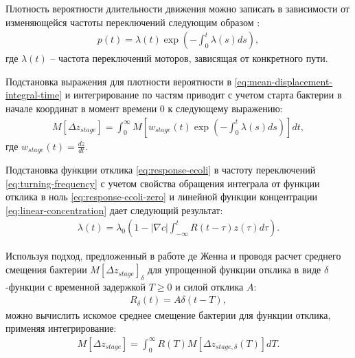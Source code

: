 Плотность вероятности длительности движения можно записать в зависимости от изменяющейся частоты переключений следующим образом \cite{pasupathy_generating_2011}:
\begin{equation}
    \begin{aligned}
        p(t)=\lambda(t) \exp \left ( -\int_0^t \lambda(s) ds \right ),
    \label{eq:duration-prob-exp-integral}
    \end{aligned}
\end{equation}
где $\lambda(t)$ -- частота переключений моторов, зависящая от конкретного пути.

Подстановка выражения для плотности вероятности в \cref{eq:mean-displacement-integral-time} и интегрирование по частям приводит с учетом старта бактерии в начале координат в момент времени 0 к следующему выражению:
\begin{equation}
    \begin{aligned}
        M\left [\Delta z_{stage} \right ]=\int_0^{\infty} M\left [w_{stage}(t) \exp \left ( -\int_0^t \lambda(s) ds \right ) \right ]dt,
    \label{eq:mean-displacement-on-frequency}
    \end{aligned}
\end{equation}
где $w_{stage}(t)=\frac{dz}{dt}$.

Подстановка функции отклика \cref{eq:response-ecoli} в частоту переключений \cref{eq:turning-frequency} с учетом свойства обращения интеграла от функции отклика в ноль \cref{eq:response-ecoli-zero} и линейной функции концентрации \cref{eq:linear-concentration} дает следующий результат:
\begin{equation}
    \begin{aligned}
        \lambda(t)=\lambda_0 \left ( 1 - |\nabla c| \int_{-\infty}^t R(t-\tau)z(\tau)d\tau \right ).
    \label{eq:frequency-on-response}
    \end{aligned}
\end{equation}

Используя подход, предложенный в работе де Женна \cite{de_gennes_chemotaxis_2004} и проводя расчет среднего смещения бактерии  $M\left [\Delta z_{stage} \right ]_{\delta}$ для упрощенной функции отклика в виде $\delta$-функции с временной задержкой $T \geq 0$ и силой отклика $A$:
\begin{equation}
    \begin{aligned}
        R_\delta(t) = A \delta(t - T),
    \label{eq:response-delta}
    \end{aligned}
\end{equation}
можно вычислить искомое среднее смещение бактерии для функции отклика, применяя интегрирование:
\begin{equation}
    \begin{aligned}
        M\left [\Delta z_{stage} \right ]=\int_0^{\infty} R(T) M\left [\Delta z_{stage,\delta}(T) \right ] dT.
    \label{eq:mean-displacement-on-md-delta}
    \end{aligned}
\end{equation}


